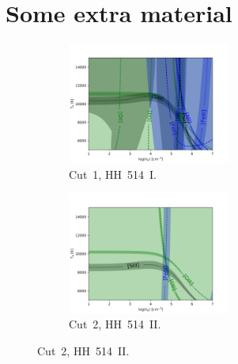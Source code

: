\documentclass[fleqn,usenatbib]{mnras}
\begin{document}






\newpage


\appendix


\section{Some extra material}

\begin{figure}
  \begin{subfigure}{7.5cm}
    \centering\includegraphics[height=4cm,width=\columnwidth]{HH514I.png}
    \caption{Cut~1, HH~514~I.}
  \end{subfigure}
  \begin{subfigure}{7.5cm}
     \centering\includegraphics[height=4cm,width=\columnwidth]{HH514II.png}
    \caption{Cut~2, HH~514~II.}
  \end{subfigure}
 

\end{figure}
\end{document}

